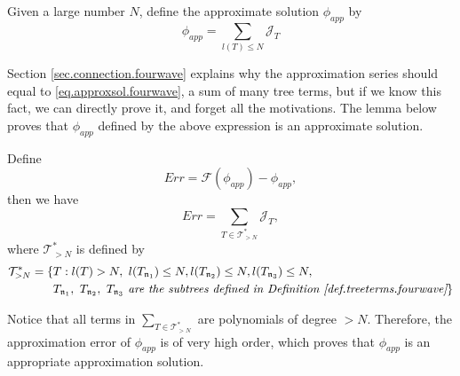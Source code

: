 \begin{defn}
Given a large number $N$, define the approximate solution $\phi_{app}$ by
\begin{equation}\label{eq.approxsol.fourwave}
 \phi_{app}=\sum_{l(T)\le N} \mathcal{J}_T
\end{equation}
\end{defn}

Section \ref{sec.connection.fourwave} explains why the approximation series should equal to \eqref{eq.approxsol.fourwave}, a sum of many tree terms, but if we know this fact, we can directly prove it, and forget all the motivations. The lemma below proves that $\phi_{app}$ defined by the above expression is an approximate solution. 

\begin{lem}\label{lem.approxerror.fourwave} Define 
\begin{equation}
 Err=\mathcal{F}(\phi_{app})-\phi_{app},
\end{equation}
then we have 
\begin{equation}\label{eq.approxerror.fourwave}
 Err=\sum_{T\in \mathcal{T}_{>N}^*} \mathcal{J}_T,
\end{equation}
where $\mathcal{T}_{>N}^*$ is defined by
\begin{equation}
\begin{split}
 \mathcal{T}_{>N}^*=\{&T:l(T)>N,\ l(T_{\mathfrak{n}_1})\le N,
 l(T_{\mathfrak{n}_2})\le N,
 l(T_{\mathfrak{n}_3})\le N,
 \\
 &T_{\mathfrak{n}_1},\ T_{\mathfrak{n}_2},\ T_{\mathfrak{n}_3}\textit{ are the subtrees defined in Definition \ref{def.treeterms.fourwave}} \}
\end{split}
\end{equation}
\end{lem}

\begin{rem}
Notice that all terms in $\sum_{T\in \mathcal{T}_{>N}^*}$ are polynomials of degree $>N$. Therefore, the approximation error of $\phi_{app}$ is of very high order, which proves that $\phi_{app}$ is an appropriate approximation solution. 
\end{rem}

